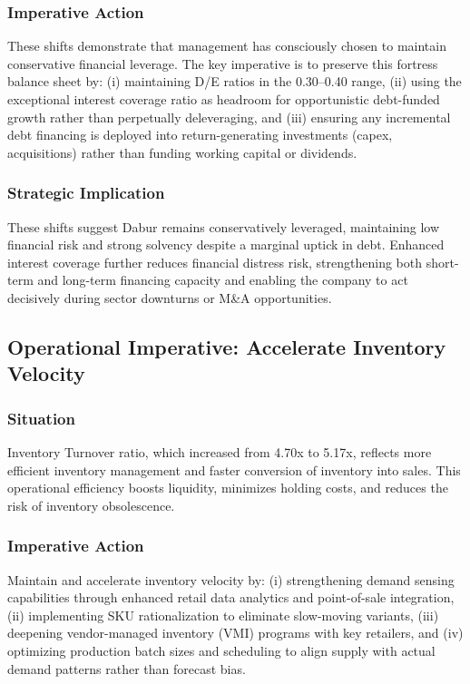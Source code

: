\documentclass[12pt, a4paper]{report}
\begin{document}
\subsubsection{Imperative Action}
These shifts demonstrate that management has consciously chosen to maintain conservative financial leverage. The key imperative is to preserve this fortress balance sheet by: (i) maintaining D/E ratios in the 0.30–0.40 range, (ii) using the exceptional interest coverage ratio as headroom for opportunistic debt-funded growth rather than perpetually deleveraging, and (iii) ensuring any incremental debt financing is deployed into return-generating investments (capex, acquisitions) rather than funding working capital or dividends.

\subsubsection{Strategic Implication}
These shifts suggest Dabur remains conservatively leveraged, maintaining low financial risk and strong solvency despite a marginal uptick in debt. Enhanced interest coverage further reduces financial distress risk, strengthening both short-term and long-term financing capacity and enabling the company to act decisively during sector downturns or M\&A opportunities.

\subsection{Operational Imperative: Accelerate Inventory Velocity}

\subsubsection{Situation}
Inventory Turnover ratio, which increased from 4.70x to 5.17x, reflects more efficient inventory management and faster conversion of inventory into sales. This operational efficiency boosts liquidity, minimizes holding costs, and reduces the risk of inventory obsolescence.

\subsubsection{Imperative Action}
Maintain and accelerate inventory velocity by: (i) strengthening demand sensing capabilities through enhanced retail data analytics and point-of-sale integration, (ii) implementing SKU rationalization to eliminate slow-moving variants, (iii) deepening vendor-managed inventory (VMI) programs with key retailers, and (iv) optimizing production batch sizes and scheduling to align supply with actual demand patterns rather than forecast bias.
\end{document}

